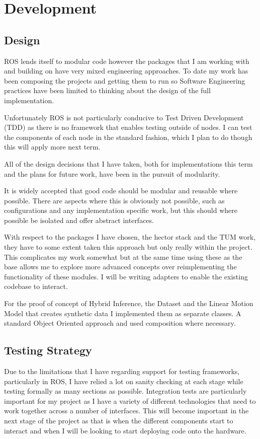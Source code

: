 \documentclass[]{../resources/final_report}
\begin{document}
\pagebreak
\section{Development}

\subsection{Design}
ROS lends itself to modular code however the packages that I am working with and building on have 
very mixed engineering approaches. To date my work has been composing the projects and getting them 
to run so Software Engineering practices have been limited to thinking about the design of the full 
implementation.

Unfortunately ROS is not particularly conducive to Test Driven Development (TDD) as there is no 
framework that enables testing outside of nodes. I can test the components of each node in the 
standard fashion, which I plan to do though this will apply more next term.

All of the design decisions that I have taken, both for implementations this term and the plans 
for future work, have been in the pursuit of modularity.

It is widely accepted that good code should be modular and reusable where possible. There are 
aspects where this is obviously not possible, such as configurations and any implementation 
specific work, but this should where possible be isolated and offer abstract interfaces.

With respect to the packages I have chosen, the hector stack and the TUM work, they have to some 
extent taken this approach but only really within the project. 
This complicates my work somewhat but at the same time using these as the base allows me to explore
 more advanced concepts over reimplementing the functionality of these modules.
I will be writing adapters to enable the existing codebase to interact.

For the proof of concept of Hybrid Inference, the Dataset and the Linear Motion Model that creates 
synthetic data I implemented them as separate classes. A standard Object Oriented approach and used
composition where necessary.


\subsection{Testing Strategy}

Due to the limitations that I have regarding support for testing frameworks, particularly in ROS, 
I have relied a lot on sanity checking at each stage while testing formally as many sections as 
possible. Integration tests are particularly important for my project as I have a variety of 
different technologies that need to work together across a number of interfaces.
This will become important in the next stage of the project as that is when the different components 
start to interact and when I will be looking to start deploying code onto the hardware.
\end{document}
